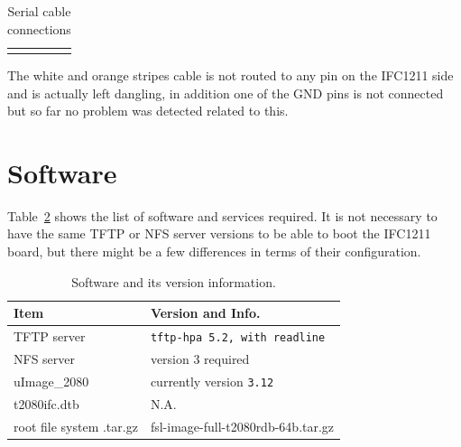 \documentclass[11pt
  , a4paper
  , article
  , oneside
  , showtrims
]{memoir}
\begin{document}
\begin{table}[!hb]
\begin{tabular}{|c|c|c|c|c|}
\fi
  \end{tabular}

\caption[]{Serial cable connections}
\label{table:ser_cable_tab}
\end{table}

The white and orange stripes cable is not routed to any pin on the IFC1211 side and is actually left dangling, in addition one of the GND pins is not connected but so far no problem was detected related to this.


\clearpage
\section{Software}
Table~\ref{table:swlist} shows the list of software and services required. It is not necessary to have the same TFTP or NFS server versions to be able to boot the IFC1211 board, but there might be a few differences in terms of their configuration.
\begin{table}[!htb]
  \centering
  \begin{tabular}{l|l}
    \toprule\rowcolor{gray!15}
    Item                      & Version and Info.                                               \\\midrule

    TFTP server               & \texttt{tftp-hpa 5.2, with readline}                            \\\midrule
    NFS server                & version 3 required                                              \\\midrule
    uImage\_2080              & currently version \texttt{3.12}                                 \\\midrule
    t2080ifc.dtb              & N.A.                                                            \\\midrule
    root file system .tar.gz  & fsl-image-full-t2080rdb-64b.tar.gz                              \\\bottomrule
  \end{tabular}
  \caption[]{Software and its version information.}
  \label{table:swlist}
\end{table}
\end{document}
